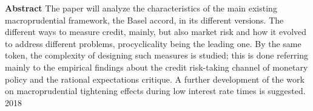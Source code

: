 \begin{titlepage}
\normalsize \textbf{Abstract}
\justify \small \singlespacing
The paper will analyze the characteristics of the main existing macroprudential framework, the Basel accord, in its different versions. The different ways to measure credit, mainly, but also market risk and how it evolved to address different problems, procyclicality being the leading one.  By the same token, the complexity of designing such measures is studied; this is done referring mainly to the empirical findings about the credit risk-taking channel of monetary policy and the rational expectations critique. A further development of the work on macroprudential tightening effects during low interest rate times is suggested.
\vspace{2cm}
\center
{\large 2018}\\[3cm] %

\vfill %


\end{titlepage}